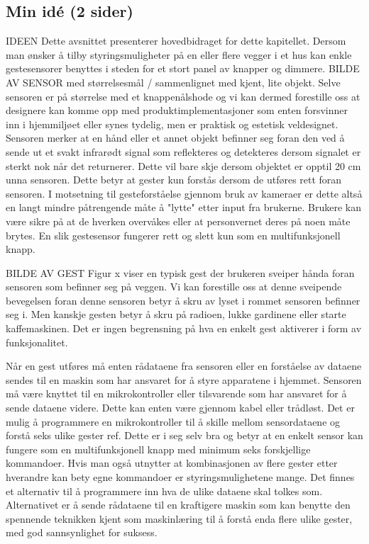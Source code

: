 \subsection{Min idé (2 sider)}
{\color{red} IDEEN} Dette avsnittet presenterer hovedbidraget for dette kapitellet. 
Dersom man ønsker å tilby styringsmuligheter på en eller flere vegger i et hus kan enkle gestesensorer benyttes i steden for et stort panel av knapper og dimmere. {\color{red} BILDE AV SENSOR med størrelsesmål / sammenlignet med kjent, lite objekt.} Selve sensoren er på størrelse med et knappenålshode og vi kan dermed forestille oss at designere kan komme opp med produktimplementasjoner som enten forsvinner inn i hjemmiljøet eller synes tydelig, men er praktisk og estetisk veldesignet. Sensoren merker at en hånd eller et annet objekt befinner seg foran den ved å sende ut et svakt infrarødt signal som reflekteres og detekteres dersom signalet er sterkt nok når det returnerer. Dette vil bare skje dersom objektet er opptil 20 cm unna sensoren. Dette betyr at gester kun forstås dersom de utføres rett foran sensoren. I motsetning til gesteforståelse gjennom bruk av kameraer er dette altså en langt mindre påtrengende måte å "lytte" etter input fra brukerne. Brukere kan være sikre på at de hverken overvåkes eller at personvernet deres på noen måte brytes. En slik gestesensor fungerer rett og slett kun som en multifunksjonell knapp.

{\color{red} BILDE AV GEST}
Figur x viser en typisk gest der brukeren sveiper hånda foran sensoren som befinner seg på veggen. Vi kan forestille oss at denne sveipende bevegelsen foran denne sensoren betyr å skru av lyset i rommet sensoren befinner seg i. Men kanskje gesten betyr å skru på radioen, lukke gardinene eller starte kaffemaskinen. Det er ingen begrensning på hva en enkelt gest aktiverer i form av funksjonalitet.

Når en gest utføres må enten rådataene fra sensoren eller en forståelse av dataene sendes til en maskin som har ansvaret for å styre apparatene i hjemmet. Sensoren må være knyttet til en mikrokontroller eller tilsvarende som har ansvaret for å sende dataene videre. Dette kan enten være gjennom kabel eller trådløst. Det er mulig å programmere en mikrokontroller til å skille mellom sensordataene og forstå seks ulike gester {\color{red} ref}. Dette er i seg selv bra og betyr at en enkelt sensor kan fungere som en multifunksjonell knapp med minimum seks forskjellige kommandoer. Hvis man også utnytter at kombinasjonen av flere gester etter hverandre kan bety egne kommandoer er styringsmulighetene mange. Det finnes et alternativ til å programmere inn hva de ulike dataene skal tolkes som. Alternativet er å sende rådataene til en kraftigere maskin som kan benytte den spennende teknikken kjent som maskinlæring til å forstå enda flere ulike gester, med god sannsynlighet for suksess.

